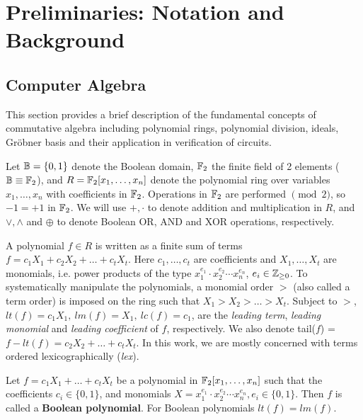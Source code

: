 \section{Preliminaries: Notation and Background}
\label{sec:prelim}

\subsection{Computer Algebra}
This section provides a brief description of the fundamental concepts of
 commutative algebra including polynomial rings, polynomial division, ideals, 
 Gr\"obner basis and their application in verification of circuits.


\par Let ${\mathbb{B}} =\{0,1\}$ denote the Boolean domain, ${\mathbb{F}}_2$ the finite field
of 2 elements (${\mathbb{B}} \equiv {\mathbb{F}}_2$), and $R = {\mathbb{F}}_2[x_1, \dots, x_n]$
denote the  polynomial ring over variables $x_1, \dots, x_n$ with
coefficients in ${\mathbb{F}}_2$.  
Operations in ${\mathbb{F}}_2$ are performed $\pmod{ 2}$, so $-1=+1$ in
${\mathbb{F}}_2$. We will use $+ ,\cdot$ to denote addition and multiplication in
$R$, and $\vee, \wedge$ and $\oplus$ to denote Boolean OR, AND and XOR
operations, respectively. 

A polynomial $f \in R$ is written as a finite sum of terms 
$f = c_1 X_1 +  c_2 X_2 + \dots + c_t X_t$.  Here $c_1, \dots, c_t$
are coefficients and $X_1, \dots, X_t$ are monomials, i.e. power
products of the type $x_1^{e_{1}}\cdot x_2^{e_{2}}\cdots x_n^{e_{n}}$, 
$e_i \in {\mathbb{Z}}_{\geq  0}$. To systematically manipulate the
polynomials, a monomial order $>$ (also called a term order) is
imposed on the ring such that  $X_1 >X_2 > \dots >  X_t$.  Subject to
$>$, $lt(f) = c_1 X_1, ~lm(f) = X_1, ~lc(f) = c_1$, are the {\it
  leading   term}, {\it   leading monomial} and {\it   leading
  coefficient} of $f$, respectively. 
 We also denote tail($f$) = $f - lt(f) = c_2X_2 + \dots + c_t X_t$. 
   In this work, we are mostly  
concerned with terms ordered lexicographically ({\it lex}).

\begin{Definition}
Let $f = c_1 X_1 + \dots + c_t X_t$ be a polynomial in
${\mathbb{F}}_2[x_1,\dots,x_n]$ such that the coefficients $c_i \in \{0, 1\}$,
and monomials $X = x_1^{e_{1}}\cdot x_2^{e_{2}}\cdots x_n^{e_{n}}, e_i
\in \{0,1\}$. 
Then $f$ is called a {\bf Boolean polynomial}. For Boolean polynomials
$lt(f) = lm(f)$. 
\end{Definition}

